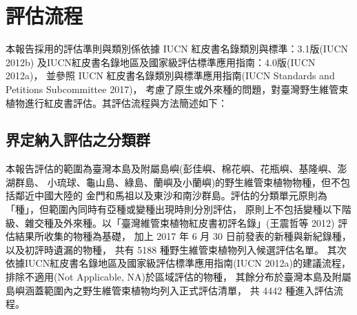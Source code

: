 \chapter{評估流程}

\begin{multicols}{2}
本報告採用的評估準則與類別係依據 IUCN 紅皮書名錄類別與標準：3.1版(IUCN 2012b)
及IUCN紅皮書名錄地區及國家級評估標準應用指南：4.0版(IUCN 2012a)，
並參照 IUCN 紅皮書名錄類別與標準應用指南(IUCN Standards and Petitions Subcommittee 2017)，
考慮了原生或外來種的問題，對臺灣野生維管束植物進行紅皮書評估。其評估流程與方法簡述如下：
\end{multicols}
\section{界定納入評估之分類群}
\begin{multicols}{2}
本報告評估的範圍為臺灣本島及附屬島嶼(彭佳嶼、棉花嶼、花瓶嶼、基隆嶼、澎湖群島、
小琉球、龜山島、綠島、蘭嶼及小蘭嶼)的野生維管束植物物種，但不包括鄰近中國大陸的
金門和馬祖以及東沙和南沙群島。評估的分類單元原則為「種」，但範圍內同時有亞種或變種出現時則分別評估，
原則上不包括變種以下階級、雜交種及外來種。以「臺灣維管束植物紅皮書初評名錄」(王震哲等 2012)
評估結果所收集的物種為基礎，
加上 2017 年 6 月 30 日前發表的新種與新紀錄種，以及初評時遺漏的物種，
共有 5188 種野生維管束植物列入候選評估名單。
其次依據IUCN紅皮書名錄地區及國家級評估標準應用指南(IUCN 2012a)的建議流程，
排除不適用(Not Applicable, NA)於區域評估的物種，
其餘分布於臺灣本島及附屬島嶼涵蓋範圍內之野生維管束植物均列入正式評估清單，
共 4442 種進入評估流程。 \\
\end{multicols}
